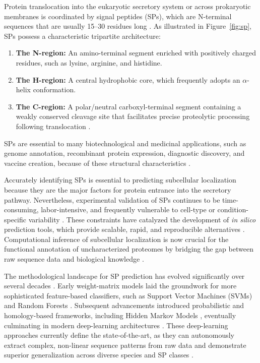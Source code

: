 \documentclass[unnumsec,webpdf,contemporary,large]{oup-authoring-template}
\begin{document}
Protein translocation into the eukaryotic secretory system or across prokaryotic membranes is coordinated by signal peptides (SPs), which are N-terminal sequences that are usually 15--30 residues long \cite{ref17,ref20}. As illustrated in Figure~\ref{fig:sp}, SPs possess a characteristic tripartite architecture:

\begin{enumerate}
\item \textbf{The N-region:} An amino-terminal segment enriched with positively charged residues, such as lysine, arginine, and histidine.
\item \textbf{The H-region:} A central hydrophobic core, which frequently adopts an $\alpha$-helix conformation.
\item \textbf{The C-region:} A polar/neutral carboxyl-terminal segment containing a weakly conserved cleavage site that facilitates precise proteolytic processing following translocation \cite{ref23}.
\end{enumerate}

SPs are essential to many biotechnological and medicinal applications, such as genome annotation, recombinant protein expression, diagnostic discovery, and vaccine creation, because of these structural characteristics \cite{ref17,ref20,ref23}.

Accurately identifying SPs is essential to predicting subcellular localization because they are the major factors for protein entrance into the secretory pathway. Nevertheless, experimental validation of SPs continues to be time-consuming, labor-intensive, and frequently vulnerable to cell-type or condition-specific variability \cite{ref23,ref6}. These constraints have catalyzed the development of \textit{in silico} prediction tools, which provide scalable, rapid, and reproducible alternatives \cite{ref13}. Computational inference of subcellular localization is now crucial for the functional annotation of uncharacterized proteomes by bridging the gap between raw sequence data and biological knowledge \cite{ref8}.

The methodological landscape for SP prediction has evolved significantly over several decades \cite{ref16}. Early weight-matrix models \cite{ref22} laid the groundwork for more sophisticated feature-based classifiers, such as Support Vector Machines (SVMs) \cite{ref21,ref7} and Random Forests \cite{ref14}. Subsequent advancements introduced probabilistic and homology-based frameworks, including Hidden Markov Models \cite{ref4}, eventually culminating in modern deep-learning architectures \cite{ref20,ref18}. These deep-learning approaches currently define the state-of-the-art, as they can autonomously extract complex, non-linear sequence patterns from raw data and demonstrate superior generalization across diverse species and SP classes \cite{ref20,ref18,ref2,ref12}.
\end{document}
